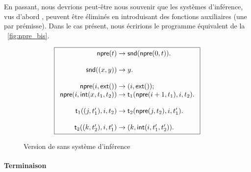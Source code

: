 En passant, nous devrions peut-être nous souvenir que les systèmes
d'inférence, vus d'abord
, peuvent être éliminés en introduisant des
fonctions auxiliaires (une par prémisse). Dans le cas présent, nous
écririons le programme équivalent de la
\fig~\vref{fig:npre_bis}.
\begin{figure}
\begin{equation*}
\boxed{
\begin{array}{r@{\;}c@{\;}l}
\fun{npre}(t) & \rightarrow & \fun{snd}(\fun{npre}(0,t)).\\
\\
\fun{snd}(\pair{x}{y}) & \rightarrow & y.\\
\\
\fun{npre}(i,\fun{ext}()) & \rightarrow & \pair{i}{\fun{ext}()};\\
\fun{npre}(i,\fun{int}(x,t_1,t_2)) & \rightarrow &
\fun{t}_1(\fun{npre}(i+1,t_1),i,t_2).\\
\\
\fun{t}_1(\pair{j}{t'_1},i,t_2) & \rightarrow &
\fun{t}_2(\fun{npre}(j,t_2),i,t'_1).\\
\\
\fun{t}_2(\pair{k}{t'_2},i,t'_1) & \rightarrow & \pair{k}{\fun{int}(i,t'_1,t'_2)}.
\end{array}
}
\end{equation*}
\caption{Version de  sans système d'inférence}
\label{fig:npre_bis}
\end{figure}

\paragraph{Terminaison}

